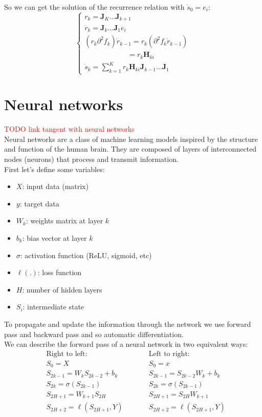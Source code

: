 \documentclass[12pt, openany]{report}
\newcommand{\J}{\mathbf{J}}
\newcommand{\He}{\mathbf{H}}
\theoremstyle{definition}
\begin{document}
So we can get the solution of the recurrence relation with $\Dot{s}_0 = e_i$:
\begin{equation}
  \begin{cases}
    r_k = \J_K \dots \J_{k+1}\\
    \Dot{r}_k = \J_k \dots \J_{1} e_i\\
    (r_k \partial^2 f_k) \Dot{r}_{k-1} = r_k (\partial^2 f_k \Dot{r}_{k-1})\\
    \qquad \qquad \qquad = r_k \He_{ki}\\
    \Dot{s}_k = \sum_{k=1}^{K} r_k \He_{ki} \J_{k-1} \dots \J_1
  \end{cases}
\end{equation}

\chapter{Neural networks}
\textcolor{red}{TODO link tangent with neural networks}\\
Neural networks are a class of machine learning models inspired by the structure and function of the human brain. They are composed of layers of interconnected nodes (neurons) that process and transmit information.\\
First let's define some variables:
\begin{itemize}
  \item $X$: input data (matrix)
  \item $y$: target data
  \item $W_k$: weights matrix at layer $k$
  \item $b_k$: bias vector at layer $k$
  \item $\sigma$: activation function (ReLU, sigmoid, etc)
  \item $\ell(.)$: loss function 
  \item $H$: number of hidden layers
  \item $S_i$: intermediate state  
\end{itemize} 
To propagate and update the information through the network we use forward pass and backward pass and so automatic differentiation.\\
We can describe the forward pass of a neural network in two equivalent ways:
\begin{equation}
  \begin{aligned}
    &\text{Right to left:} \qquad &&\text{Left to right:}\\
    &S_0 = X \qquad &&S_0 = x\\
    &S_{2k-1} = W_k S_{2k-2} + b_k \qquad &&S_{2k-1} = S_{2k-2}W_k + b_k\\
    &S_{2k} = \sigma(S_{2k-1}) \qquad &&S_{2k} = \sigma(S_{2k-1})\\
    &S_{2H+1} = W_{k+1}S_{2H} \qquad &&S_{2H+1} = S_{2H}W_{k+1}\\
    &S_{2H+2} = \ell(S_{2H+1}, Y) \qquad &&S_{2H+2} = \ell(S_{2H+1}, Y)\\ 
  \end{aligned}
\end{equation}
\end{document}
